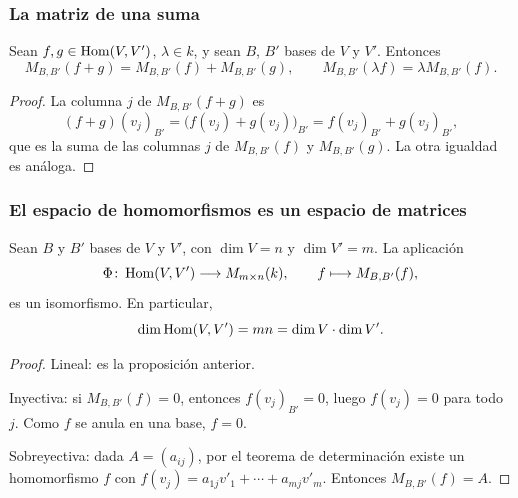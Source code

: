 \begin{frame}
    \frametitle{La matriz de una suma}

    \begin{proposition}
        Sean $f,g\in\operatorname{Hom}(V,V')$, $\lambda\in k$, y sean $B$, $B'$ bases de
        $V$ y $V'$. Entonces
        \[
            M_{B,B'}(f+g)=M_{B,B'}(f)+M_{B,B'}(g),
            \qquad
            M_{B,B'}(\lambda f)=\lambda M_{B,B'}(f).
        \]
    \end{proposition}

    \begin{proof}
        La columna $j$ de $M_{B,B'}(f+g)$ es
        \[
            (f+g)(v_j)_{B'}=\bigl(f(v_j)+g(v_j)\bigr)_{B'}
            =f(v_j)_{B'}+g(v_j)_{B'},
        \]
        que es la suma de las columnas $j$ de $M_{B,B'}(f)$ y $M_{B,B'}(g)$.
        La otra igualdad es análoga.
    \end{proof}
\end{frame}


\begin{frame}
    \frametitle{El espacio de homomorfismos es un espacio de matrices}

    \begin{theorem}
        Sean $B$ y $B'$ bases de $V$ y $V'$, con $\dim V=n$ y
        $\dim V'=m$. La aplicación
        \[
            \Phi\colon\operatorname{Hom}(V,V')\longrightarrow M_{m\times n}(k),
            \qquad f\longmapsto M_{B,B'}(f),
        \]
        es un isomorfismo. En particular,
        \[
            \dim\operatorname{Hom}(V,V')=mn=\dim V\cdot\dim V'.
        \]
    \end{theorem}

    \begin{proof}
        \alert{Lineal:} es la proposición anterior.

        \alert{Inyectiva:} si $M_{B,B'}(f)=0$, entonces $f(v_j)_{B'}=0$, luego
        $f(v_j)=0$ para todo $j$. Como $f$ se anula en una base,
        $f=0$.

        \alert{Sobreyectiva:} dada $A=(a_{ij})$, por el teorema de
        determinación existe un homomorfismo $f$ con
        $f(v_j)=a_{1j}v'_1+\cdots+a_{mj}v'_m$. Entonces
        $M_{B,B'}(f)=A$.
    \end{proof}
\end{frame}



